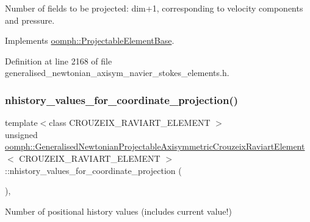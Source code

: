 Number of fields to be projected\+: dim+1, corresponding to velocity components and pressure. 



Implements \hyperlink{classoomph_1_1ProjectableElementBase_a44634aa4049332a580d249c25564638c}{oomph\+::\+Projectable\+Element\+Base}.



Definition at line 2168 of file generalised\+\_\+newtonian\+\_\+axisym\+\_\+navier\+\_\+stokes\+\_\+elements.\+h.

\mbox{\label{classoomph_1_1GeneralisedNewtonianProjectableAxisymmetricCrouzeixRaviartElement_a551405a5bd38e4d945e29a7dae405f8e}} 
\subsubsection{\texorpdfstring{nhistory\+\_\+values\+\_\+for\+\_\+coordinate\+\_\+projection()}{nhistory\_values\_for\_coordinate\_projection()}}
{\footnotesize\ttfamily template$<$class C\+R\+O\+U\+Z\+E\+I\+X\+\_\+\+R\+A\+V\+I\+A\+R\+T\+\_\+\+E\+L\+E\+M\+E\+NT $>$ \\
unsigned \hyperlink{classoomph_1_1GeneralisedNewtonianProjectableAxisymmetricCrouzeixRaviartElement}{oomph\+::\+Generalised\+Newtonian\+Projectable\+Axisymmetric\+Crouzeix\+Raviart\+Element}$<$ C\+R\+O\+U\+Z\+E\+I\+X\+\_\+\+R\+A\+V\+I\+A\+R\+T\+\_\+\+E\+L\+E\+M\+E\+NT $>$\+::nhistory\+\_\+values\+\_\+for\+\_\+coordinate\+\_\+projection (\begin{DoxyParamCaption}{ }\end{DoxyParamCaption})\hspace{0.3cm}{\ttfamily [inline]}, {\ttfamily [virtual]}}



Number of positional history values (includes current value!) 



